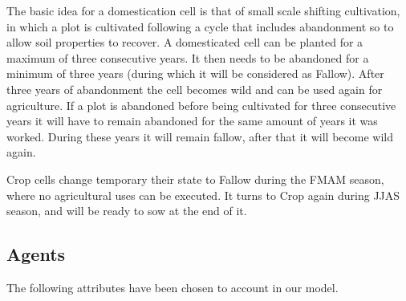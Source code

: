 \documentclass[11pt,oneside,a4paper,openright]{report}
\begin{document}
The basic idea for a domestication cell is that of small scale shifting cultivation, in which a plot is
cultivated following a cycle that includes abandonment so to allow soil properties to recover. A
domesticated cell can be planted for a maximum of three consecutive years. It then needs to be
abandoned for a minimum of three years (during which it will be considered as Fallow). After three
years of abandonment the cell becomes wild and can be used again for agriculture. If a plot is
abandoned before being cultivated for three consecutive years it will have to remain abandoned for
the same amount of years it was worked. During these years it will remain fallow, after that it will
become wild again.

Crop cells change temporary their state to Fallow during the FMAM season, where no agricultural
uses can be executed. It turns to Crop again during JJAS season, and will be ready to sow at the end
of it.


\subsection{Agents}
\label{sec:AgentAttribs}
The following attributes have been chosen to account in our model.
\end{document}

